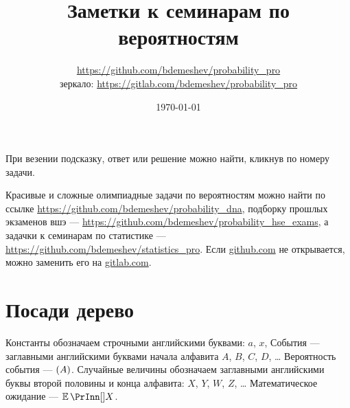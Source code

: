 \documentclass[12pt, a4paper]{article}
\title{Заметки к семинарам по вероятностям}
\author{\url{https://github.com/bdemeshev/probability_pro} \\
зеркало: \url{https://gitlab.com/bdemeshev/probability_pro}}
\date{\today}
\let\P\relax
\begin{document}
\maketitle %


\newpage
\tableofcontents{}

\newpage

При везении подсказку, ответ или решение можно найти, кликнув по номеру задачи. 

Красивые и сложные олимпиадные задачи по вероятностям можно найти по ссылке \url{https://github.com/bdemeshev/probability_dna},
подборку прошлых экзаменов вшэ — \url{https://github.com/bdemeshev/probability_hse_exams},
а задачки к семинарам по статистике — \url{https://github.com/bdemeshev/statistics_pro}.
Если \url{github.com} не открывается, можно заменить его на \url{gitlab.com}.


\section{Посади дерево}

\begin{leftbar}
Константы обозначаем строчными английскими буквами: $a$, $x$, События ­— заглавными английскими буквами начала алфавита $A$, $B$, $C$, $D$, \ldots{ } Вероятность события — $\P(A)$.
Случайные величины обозначаем заглавными английскими буквы второй половины и конца алфавита: $X$, $Y$, $W$, $Z$, \ldots{ } Математическое ожидание — $\E(X)$.
\end{leftbar}
\end{document}
